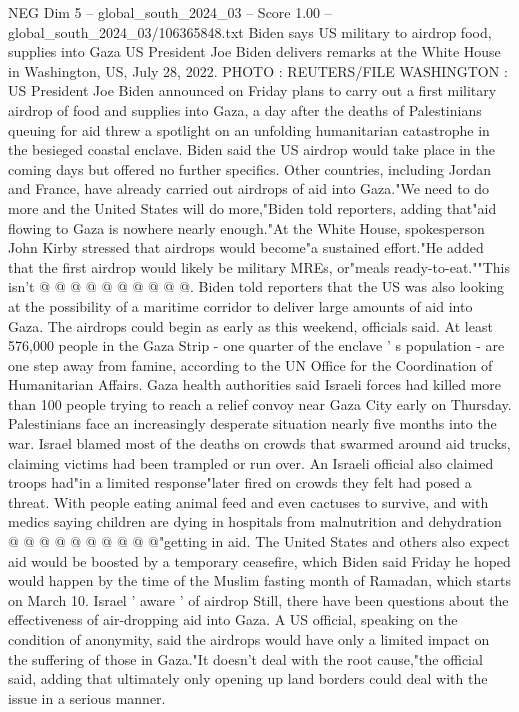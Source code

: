 \begin{textsample}{NEG Dim 5 – global\_south\_2024\_03 – Score 1.00 – global\_south\_2024\_03/106365848.txt}  \label{ex:f5_neg_317}
Biden says US military to airdrop food, supplies into Gaza US President Joe Biden delivers remarks at the White House in Washington, US, July 28, 2022.
PHOTO : REUTERS/FILE WASHINGTON : US President Joe Biden announced on Friday plans to carry out a first military airdrop of food and supplies into Gaza, a day after the deaths of Palestinians queuing for aid threw a spotlight on an unfolding humanitarian catastrophe in the besieged coastal enclave.
Biden said the US airdrop would take place in the coming days but offered no further specifics.
Other countries, including Jordan and France, have already carried out airdrops of aid into Gaza."We need to do more and the United States will do more,"Biden told reporters, adding that"aid flowing to Gaza is nowhere nearly enough."At the White House, spokesperson John Kirby stressed that airdrops would become"a sustained effort."He added that the first airdrop would likely be military MREs, or"meals ready-to-eat.""This isn't @ @ @ @ @ @ @ @ @ @.
Biden told reporters that the US was also looking at the possibility of a maritime corridor to deliver large amounts of aid into Gaza.
The airdrops could begin as early as this weekend, officials said.
At least 576,000 people in the Gaza Strip - one quarter of the enclave ' s population - are one step away from famine, according to the UN Office for the Coordination of Humanitarian Affairs.
Gaza health authorities said Israeli forces had killed more than 100 people trying to reach a relief convoy near Gaza City early on Thursday.
Palestinians face an increasingly desperate situation nearly five months into the war.
Israel blamed most of the deaths on crowds that swarmed around aid trucks, claiming victims had been trampled or run over.
An Israeli official also claimed troops had"in a limited response"later fired on crowds they felt had posed a threat.
With people eating animal feed and even cactuses to survive, and with medics saying children are dying in hospitals from malnutrition and dehydration @ @ @ @ @ @ @ @ @ @"getting in aid.
The United States and others also expect aid would be boosted by a temporary ceasefire, which Biden said Friday he hoped would happen by the time of the Muslim fasting month of Ramadan, which starts on March 10.
Israel ' aware ' of airdrop Still, there have been questions about the effectiveness of air-dropping aid into Gaza.
A US official, speaking on the condition of anonymity, said the airdrops would have only a limited impact on the suffering of those in Gaza."It doesn't deal with the root cause,"the official said, adding that ultimately only opening up land borders could deal with the issue in a serious manner.

\end{textsample}
